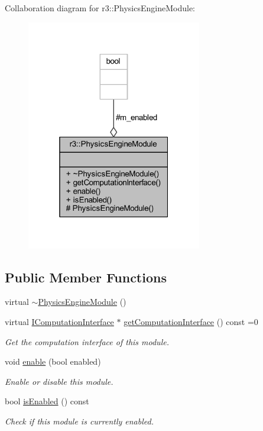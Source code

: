 Collaboration diagram for r3\+:\+:Physics\+Engine\+Module\+:\nopagebreak
\begin{figure}[H]
\begin{center}
\leavevmode
\includegraphics[width=217pt]{classr3_1_1_physics_engine_module__coll__graph}
\end{center}
\end{figure}
\subsection*{Public Member Functions}
\begin{DoxyCompactItemize}
\item 
virtual \mbox{\hyperlink{classr3_1_1_physics_engine_module_af2b491daa564a15ec5362780c885e2ca}{$\sim$\+Physics\+Engine\+Module}} ()
\item 
virtual \mbox{\hyperlink{classr3_1_1_i_computation_interface}{I\+Computation\+Interface}} $\ast$ \mbox{\hyperlink{classr3_1_1_physics_engine_module_a3b1d0d9bea0a82534f367f6d728312d3}{get\+Computation\+Interface}} () const =0
\begin{DoxyCompactList}\small\item\em Get the computation interface of this module. \end{DoxyCompactList}\item 
void \mbox{\hyperlink{classr3_1_1_physics_engine_module_abaaace8d25ea23ed21ade61ca2b201d0}{enable}} (bool enabled)
\begin{DoxyCompactList}\small\item\em Enable or disable this module. \end{DoxyCompactList}\item 
bool \mbox{\hyperlink{classr3_1_1_physics_engine_module_add8b93ca3e3e3ec0ff045c15610119ea}{is\+Enabled}} () const
\begin{DoxyCompactList}\small\item\em Check if this module is currently enabled. \end{DoxyCompactList}\end{DoxyCompactItemize}
